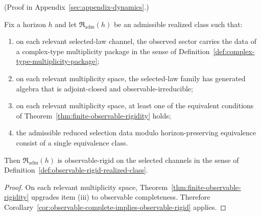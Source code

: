 (Proof in Appendix~\ref{sec:appendix-dynamics}.)

\begin{corollary}
\label{cor:finite-observable-rigidity-implies-observable-rigid}
Fix a horizon $h$ and let $\mathfrak R_{\mathrm{adm}}(h)$ be an admissible
realized class such that:
\begin{enumerate}[label=(\roman*), leftmargin=2em, itemsep=0.2em]
\item on each relevant selected-law channel, the observed sector carries the
      data of a complex-type multiplicity package in the sense of
      Definition~\ref{def:complex-type-multiplicity-package};
\item on each relevant multiplicity space, the selected-law family has
      generated algebra that is adjoint-closed and observable-irreducible;
\item on each relevant multiplicity space, at least one of the equivalent
      conditions of Theorem~\ref{thm:finite-observable-rigidity} holds;
\item the admissible reduced selection data modulo horizon-preserving
      equivalence consist of a single equivalence class.
\end{enumerate}
Then $\mathfrak R_{\mathrm{adm}}(h)$ is observable-rigid on the selected
channels in the sense of
Definition~\ref{def:observable-rigid-realized-class}.
\end{corollary}

\begin{proof}
On each relevant multiplicity space,
Theorem~\ref{thm:finite-observable-rigidity} upgrades item (iii) to
observable completeness. Therefore
Corollary~\ref{cor:observable-complete-implies-observable-rigid} applies.
\end{proof}

